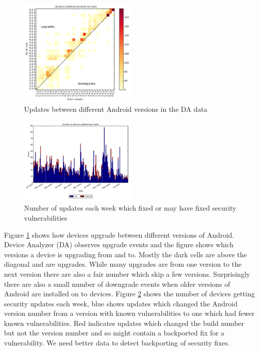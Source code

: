 \documentclass[a4paper,twocolumn]{article}
\begin{document}
\begin{figure}
 \includegraphics[width=0.5\textwidth]{figures/from_to_updates.pdf}
 \caption{Updates between different Android versions in the DA data}
 \label{fig:from_to_updates}
\end{figure}
\begin{figure}
 \includegraphics[width=0.5\textwidth]{figures/w_security_updates.pdf}
 \caption{Number of updates each week which fixed or may have fixed security vulnerabilities}
 \label{fig:weekly_security_updates}
\end{figure}
Figure \ref{fig:from_to_updates} shows how devices upgrade between different versions of Android.
Device Analyzer (DA) observes upgrade events and the figure shows which versions a device is upgrading from and to.
Mostly the dark cells are above the diagonal and are upgrades.
While many upgrades are from one version to the next version there are also a fair number which skip a few versions.
Surprisingly there are also a small number of downgrade events when older versions of Android are installed on to devices.
Figure \ref{fig:weekly_security_updates} shows the number of devices getting security updates each week, blue shows updates which changed the Android version number from a version with known vulnerabilities to one which had fewer known vulnerabilities.
Red indicates updates which changed the build number but not the version number and so might contain a backported fix for a vulnerability.
We need better data to detect backporting of security fixes.
\end{document}
